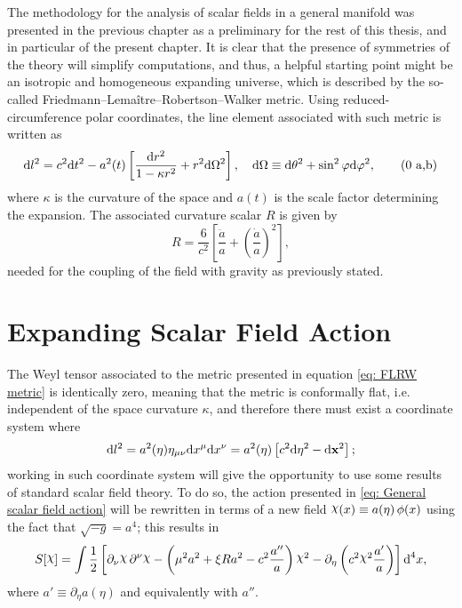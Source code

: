 The methodology for the analysis of scalar fields in a general manifold was presented in the previous chapter as a  preliminary for the rest of this thesis, and in particular of the present chapter. It is clear that the presence of symmetries of the theory will simplify computations, and thus, a helpful starting point might be an isotropic and homogeneous expanding universe, which is described by the so-called Friedmann–Lemaître–Robertson–Walker metric. Using  reduced-circumference polar coordinates, the line element associated with such metric is written as
\begin{subequations}\label{eq: FLRW metric}
	\begin{gather}
		\text{d} l^2 =c^2\text{d} t^2 -a^2(t)\left[\frac{\text{d} r^2}{1-\kappa r^2}+r^2\text{d}\Omega^2\right],\quad \text{d}\Omega\equiv \text{d}\theta^2+\sin^2\varphi\text{d}\varphi^2,\tag{\theequation \,\,a,b}
	\end{gather}
\end{subequations}
where $\kappa$ is the curvature of the space and $a(t)$ is the scale factor determining the expansion. The associated curvature scalar $R$ is given by
\begin{equation}\label{eq: FLRW Curvature}
	R=\frac{6}{c^2}\left[\frac{\ddot{a}}{a}+\left(\frac{\dot{a}}{a}\right)^2\right],
\end{equation}
needed for the coupling of the field with gravity as previously stated.

\vspace{0.25cm}
\section{Expanding Scalar Field Action}
The Weyl tensor associated to the metric presented in equation \ref{eq: FLRW metric} is identically zero, meaning that the metric is conformally flat, i.e. independent of the space curvature $\kappa$, and therefore there must exist a coordinate system where
\begin{equation}\label{eq: Conformal FLRW}
	\text{d} l^2=a^2(\eta)\eta_{\mu\nu}\text{d} x^\mu\text{d} x^\nu=a^2(\eta)\left[c^2\text{d} \eta^2-\text{d}\mathbf{x}^2\right];
\end{equation}
working in such coordinate system will give the opportunity to use some results of standard scalar field theory. To do so, the action presented in \cref{eq: General scalar field action} will be rewritten in terms of a new field $\rchi(x)\equiv a(\eta)\,\phi(x)$ using the fact that $\sqrt{-g}=a^4$; this results in
\begin{equation}
	S[\rchi]=\int\frac{1}{2}\left[\partial_\nu\rchi\,\partial^\nu\rchi-\left(\mu^2a^2+\xi R a^2-c^2\frac{a''}{a}\right)\rchi^2-\partial_\eta\left(c^2\rchi^2\frac{a'}{a}\right)\right]\td^4 x,
\end{equation}
where $a'\equiv \partial_\eta a(\eta)$ and equivalently with $a''$.

